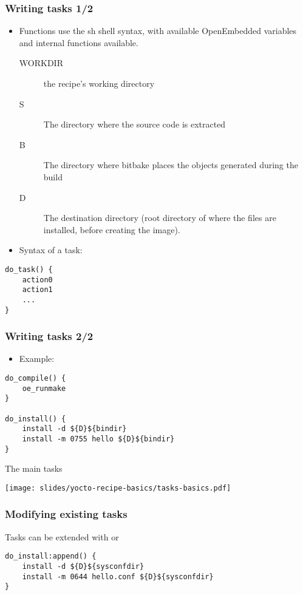 \begin{frame}[fragile]
  \frametitle{Writing tasks 1/2}
  \begin{itemize}
    \item Functions use the sh shell syntax, with available
      OpenEmbedded variables and internal functions available.
      \begin{description}
        \item[WORKDIR] the recipe's working directory
        \item[S] The directory where the source code is extracted
        \item[B] The directory where bitbake places the objects
          generated during the build
        \item[D] The destination directory (root directory of where
          the files are installed, before creating the image).
      \end{description}
    \item Syntax of a task:
  \end{itemize}
  \begin{block}{}
    \begin{verbatim}
do_task() {
    action0
    action1
    ...
}
    \end{verbatim}
  \end{block}
\end{frame}

\begin{frame}[fragile]
  \frametitle{Writing tasks 2/2}
  \begin{itemize}
    \item Example:
  \end{itemize}
  \begin{block}{}
    \begin{verbatim}
do_compile() {
    oe_runmake
}

do_install() {
    install -d ${D}${bindir}
    install -m 0755 hello ${D}${bindir}
}
    \end{verbatim}
  \end{block}
\end{frame}

\begin{frame}{The main tasks}
  \begin{center}
    \texttt{[image: slides/yocto-recipe-basics/tasks-basics.pdf]}
  \end{center}
\end{frame}

\begin{frame}[fragile]
  \frametitle{Modifying existing tasks}
  Tasks can be extended with  or 
  \begin{block}{}
    \begin{verbatim}
do_install:append() {
    install -d ${D}${sysconfdir}
    install -m 0644 hello.conf ${D}${sysconfdir}
}
    \end{verbatim}
  \end{block}
\end{frame}

